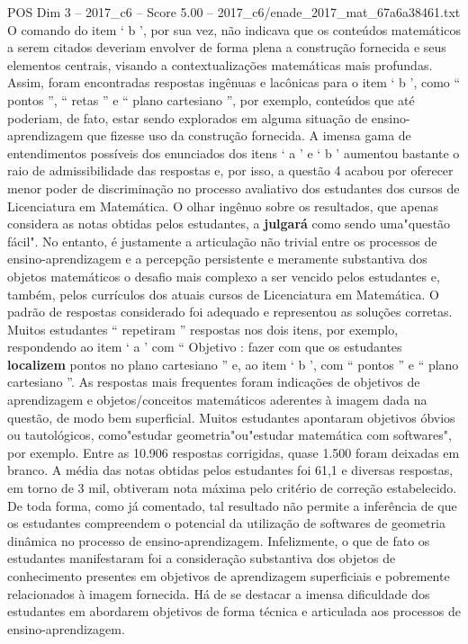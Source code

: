 \begin{textsample}{POS Dim 3 – 2017\_c6 – Score 5.00 – 2017\_c6/enade\_2017\_mat\_67a6a38461.txt}
O comando do item ‘ b ’, por sua vez, não indicava que os conteúdos matemáticos a serem citados deveriam envolver de forma plena a construção fornecida e seus elementos centrais, visando a contextualizações matemáticas mais profundas.
Assim, foram encontradas respostas ingênuas e lacônicas para o item ‘ b ’, como “ pontos ”, “ retas ” e “ plano cartesiano ”, por exemplo, conteúdos que até poderiam, de fato, estar sendo explorados em alguma situação de ensino-aprendizagem que fizesse uso da construção fornecida.
A imensa gama de entendimentos possíveis dos enunciados dos itens ‘ a ’ e ‘ b ’ aumentou bastante o raio de admissibilidade das respostas e, por isso, a questão 4 acabou por oferecer menor poder de discriminação no processo avaliativo dos estudantes dos cursos de Licenciatura em Matemática.
O olhar ingênuo sobre os resultados, que apenas considera as notas obtidas pelos estudantes, a \textbf{julgará} como sendo uma"questão fácil".
No entanto, é justamente a articulação não trivial entre os processos de ensino-aprendizagem e a percepção persistente e meramente substantiva dos objetos matemáticos o desafio mais complexo a ser vencido pelos estudantes e, também, pelos currículos dos atuais cursos de Licenciatura em Matemática.
O padrão de respostas considerado foi adequado e representou as soluções corretas.
Muitos estudantes “ repetiram ” respostas nos dois itens, por exemplo, respondendo ao item ‘ a ’ com “ Objetivo : fazer com que os estudantes \textbf{localizem} pontos no plano cartesiano ” e, ao item ‘ b ’, com “ pontos ” e “ plano cartesiano ”.
As respostas mais frequentes foram indicações de objetivos de aprendizagem e objetos/conceitos matemáticos aderentes à imagem dada na questão, de modo bem superficial.
Muitos estudantes apontaram objetivos óbvios ou tautológicos, como"estudar geometria"ou"estudar matemática com softwares", por exemplo.
Entre as 10.906 respostas corrigidas, quase 1.500 foram deixadas em branco.
A média das notas obtidas pelos estudantes foi 61,1 e diversas respostas, em torno de 3 mil, obtiveram nota máxima pelo critério de correção estabelecido.
De toda forma, como já comentado, tal resultado não permite a inferência de que os estudantes compreendem o potencial da utilização de softwares de geometria dinâmica no processo de ensino-aprendizagem.
Infelizmente, o que de fato os estudantes manifestaram foi a consideração substantiva dos objetos de conhecimento presentes em objetivos de aprendizagem superficiais e pobremente relacionados à imagem fornecida.
Há de se destacar a imensa dificuldade dos estudantes em abordarem objetivos de forma técnica e articulada aos processos de ensino-aprendizagem.

\end{textsample}

